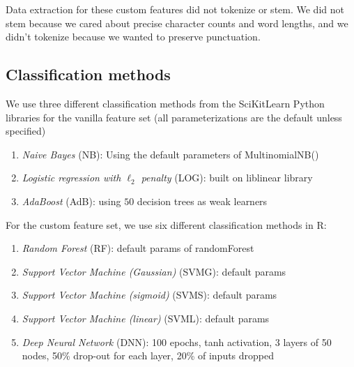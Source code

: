 \documentclass{article} %
\begin{document}
Data extraction for these custom features did not tokenize or stem. We did not stem because we cared about precise character counts and word lengths, and we didn't tokenize because we wanted to preserve punctuation.\\


\subsection{Classification methods}

We use three different classification methods from the SciKitLearn Python libraries for the vanilla feature set (all parameterizations are the default unless specified)
\begin{enumerate}
\item \emph{Naive Bayes} (NB): Using the default parameters of MultinomialNB()
\item \emph{Logistic regression with $\ell_2$ penalty} (LOG): built on liblinear library
\item \emph{AdaBoost} (AdB): using $50$ decision trees as weak learners
\end{enumerate}

For the custom feature set, we use six different classification methods in R:
\begin{enumerate}
\item \emph{Random Forest} (RF): default params of randomForest
\item \emph{Support Vector Machine (Gaussian)} (SVMG): default params
\item \emph{Support Vector Machine (sigmoid)} (SVMS): default params
\item \emph{Support Vector Machine (linear)} (SVML): default params
\item \emph{Deep Neural Network} (DNN): 100 epochs, tanh activation, 3 layers of 50 nodes, 50\% drop-out for each layer, 20\% of inputs dropped
\end{enumerate}
\end{document}
